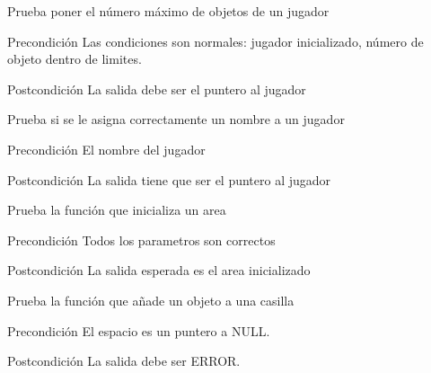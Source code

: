 \begin{DoxyRefList}
\item[\label{test__test000229}%
\hypertarget{test__test000229}{}%
Global \hyperlink{player__test_8c_a5ea6b684fa6964067d029d5fee042874}{test1\-\_\-player\-\_\-set\-\_\-max\-\_\-objects} ()]Prueba poner el número máximo de objetos de un jugador \begin{DoxyPrecond}{Precondición}
Las condiciones son normales\-: jugador inicializado, número de objeto dentro de limites. 
\end{DoxyPrecond}
\begin{DoxyPostcond}{Postcondición}
La salida debe ser el puntero al jugador  
\end{DoxyPostcond}

\item[\label{test__test000204}%
\hypertarget{test__test000204}{}%
Global \hyperlink{player__test_8c_a9d87c09e6af910d695265e3fd77ae3a2}{test1\-\_\-player\-\_\-set\-\_\-name} ()]Prueba si se le asigna correctamente un nombre a un jugador \begin{DoxyPrecond}{Precondición}
El nombre del jugador 
\end{DoxyPrecond}
\begin{DoxyPostcond}{Postcondición}
La salida tiene que ser el puntero al jugador  
\end{DoxyPostcond}

\item[\label{test__test000234}%
\hypertarget{test__test000234}{}%
Global \hyperlink{screen__test_8c_aa23ce60db269100ad04e94c853777202}{test1\-\_\-screen\-\_\-area\-\_\-init} ()]Prueba la función que inicializa un area \begin{DoxyPrecond}{Precondición}
Todos los parametros son correctos 
\end{DoxyPrecond}
\begin{DoxyPostcond}{Postcondición}
La salida esperada es el area inicializado  
\end{DoxyPostcond}

\item[\label{test__test000304}%
\hypertarget{test__test000304}{}%
Global \hyperlink{space__test_8c_afe51f379fb29f8e96f9f034df991de30}{test1\-\_\-space\-\_\-add\-\_\-object} ()]Prueba la función que añade un objeto a una casilla \begin{DoxyPrecond}{Precondición}
El espacio es un puntero a N\-U\-L\-L. 
\end{DoxyPrecond}
\begin{DoxyPostcond}{Postcondición}
La salida debe ser E\-R\-R\-O\-R.  
\end{DoxyPostcond}


\end{DoxyRefList}
